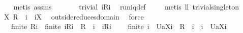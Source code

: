 \begin{isabellebody}
\ \ \isamarkupfalse%
\ {\isacharparenleft}metis\ assms{\isacharparenleft}{}{\isacharparenright}{\isacharparenright}\isanewline
\ \ \isamarkupfalse%
\ \isamarkupfalse%
\ \isamarkupfalse%
\ {\isachardoublequoteopen}trivial\ {\isacharparenleft}{\isacharbraceleft}i{\isacharbraceright}{\isasymtimes}{\isacharparenleft}{\isacharquery}R{\isacharbackquote}{\isacharbackquote}{\isacharbraceleft}i{\isacharbraceright}{\isacharparenright}{\isacharparenright}{\isachardoublequoteclose}\ \isamarkupfalse%
\ runiq{\isacharunderscore}def\ \isanewline
\ \ \isamarkupfalse%
\ {\isacharparenleft}metis\ ll{}{}\ trivial{\isacharunderscore}singleton{\isacharparenright}\isanewline
\ \ \isamarkupfalse%
\ \isamarkupfalse%
\ {\isachardoublequoteopen}{\isasymforall}X{\isachardot}\ {\isacharparenleft}{\isacharquery}R\ {\isacharminus}{\isacharminus}\ i{\isacharparenright}\ {\isasyminter}\ {\isacharparenleft}{\isacharbraceleft}i{\isacharbraceright}{\isasymtimes}X{\isacharparenright}{\isacharequal}{\isacharbraceleft}{\isacharbraceright}{\isachardoublequoteclose}\ \isamarkupfalse%
\ outside{\isacharunderscore}reduces{\isacharunderscore}domain\ \isamarkupfalse%
\ force\isanewline
\ \ \isamarkupfalse%
\ \isamarkupfalse%
\ \isanewline
\ \ {}{\isacharcolon}\ {\isachardoublequoteopen}finite\ {\isacharparenleft}{\isacharquery}R{\isacharminus}{\isacharminus}i{\isacharparenright}\ {\isacharampersand}\ finite\ {\isacharparenleft}{\isacharbraceleft}i{\isacharbraceright}{\isasymtimes}{\isacharparenleft}{\isacharquery}R{\isacharbackquote}{\isacharbackquote}{\isacharbraceleft}i{\isacharbraceright}{\isacharparenright}{\isacharparenright}\ {\isacharampersand}\ {\isacharparenleft}{\isacharquery}R\ {\isacharminus}{\isacharminus}\ i{\isacharparenright}\ {\isasyminter}\ {\isacharparenleft}{\isacharbraceleft}i{\isacharbraceright}{\isasymtimes}{\isacharparenleft}{\isacharquery}R{\isacharbackquote}{\isacharbackquote}{\isacharbraceleft}i{\isacharbraceright}{\isacharparenright}{\isacharparenright}{\isacharequal}{\isacharbraceleft}{\isacharbraceright}\ {\isacharampersand}\ \isanewline
\ \ finite\ {\isacharparenleft}{\isacharbraceleft}i{\isacharbraceright}\ {\isasymtimes}\ {\isacharbraceleft}{\isacharquery}U{\isacharparenleft}a{\isacharbackquote}{\isacharbackquote}{\isacharparenleft}X{\isasymunion}{\isacharbraceleft}i{\isacharbraceright}{\isacharparenright}{\isacharparenright}{\isacharbraceright}{\isacharparenright}\ {\isacharampersand}\ {\isacharparenleft}{\isacharquery}R\ {\isacharminus}{\isacharminus}\ i{\isacharparenright}\ {\isasyminter}\ {\isacharparenleft}{\isacharbraceleft}i{\isacharbraceright}\ {\isasymtimes}\ {\isacharbraceleft}{\isacharquery}U{\isacharparenleft}a{\isacharbackquote}{\isacharbackquote}{\isacharparenleft}X{\isasymunion}{\isacharbraceleft}i{\isacharbraceright}{\isacharparenright}{\isacharparenright}{\isacharbraceright}{\isacharparenright}{\isacharequal}{\isacharbraceleft}{\isacharbraceright}{\isachardoublequoteclose}\ \isanewline

\end{isabellebody}
